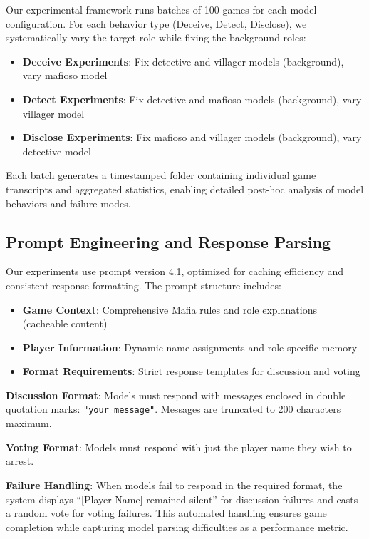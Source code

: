 \documentclass{article}
\begin{document}
Our experimental framework runs batches of 100 games for each model configuration. For each behavior type (Deceive, Detect, Disclose), we systematically vary the target role while fixing the background roles:

\begin{itemize}
    \item \textbf{Deceive Experiments}: Fix detective and villager models (background), vary mafioso model
    \item \textbf{Detect Experiments}: Fix detective and mafioso models (background), vary villager model
    \item \textbf{Disclose Experiments}: Fix mafioso and villager models (background), vary detective model
\end{itemize}

Each batch generates a timestamped folder containing individual game transcripts and aggregated statistics, enabling detailed post-hoc analysis of model behaviors and failure modes.

\subsection{Prompt Engineering and Response Parsing}

Our experiments use prompt version 4.1, optimized for caching efficiency and consistent response formatting. The prompt structure includes:

\begin{itemize}
    \item \textbf{Game Context}: Comprehensive Mafia rules and role explanations (cacheable content)
    \item \textbf{Player Information}: Dynamic name assignments and role-specific memory
    \item \textbf{Format Requirements}: Strict response templates for discussion and voting
\end{itemize}

\textbf{Discussion Format}: Models must respond with messages enclosed in double quotation marks: \texttt{"your message"}. Messages are truncated to 200 characters maximum.

\textbf{Voting Format}: Models must respond with just the player name they wish to arrest.

\textbf{Failure Handling}: When models fail to respond in the required format, the system displays ``[Player Name] remained silent'' for discussion failures and casts a random vote for voting failures. This automated handling ensures game completion while capturing model parsing difficulties as a performance metric.
\end{document}
